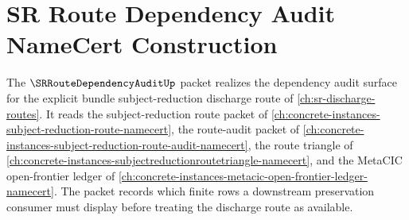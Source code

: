 \chapter{SR Route Dependency Audit NameCert Construction}
\label{ch:concrete-instances-sr-route-dependency-audit-namecert}

The $\SRRouteDependencyAuditUp$ packet realizes the dependency audit surface for the explicit bundle subject-reduction discharge route of \autoref{ch:sr-discharge-routes}. It reads the subject-reduction route packet of \autoref{ch:concrete-instances-subject-reduction-route-namecert}, the route-audit packet of \autoref{ch:concrete-instances-subject-reduction-route-audit-namecert}, the route triangle of \autoref{ch:concrete-instances-subjectreductionroutetriangle-namecert}, and the MetaCIC open-frontier ledger of \autoref{ch:concrete-instances-metacic-open-frontier-ledger-namecert}. The packet records which finite rows a downstream preservation consumer must display before treating the discharge route as available.

